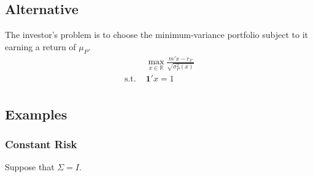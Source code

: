 \documentclass[12pt]{article}
\begin{document}
\subsection{Alternative}
The investor's problem is to choose the minimum-variance portfolio subject to it earning a return of $\mu_{P}$. 
\begin{equation}
	\begin{array}{rl}
		&\max_{x\in\mathbb{R}}\frac{m'x-r_{F}}{\sqrt{\sigma_{P}^{2}(x)}}\\
		\text{s.t. }&\mathbf{1}'x=1\\
	\end{array}
\end{equation}
\subsection{Examples}
\subsubsection{Constant Risk}
Suppose that $\Sigma=I$. 
\end{document}
